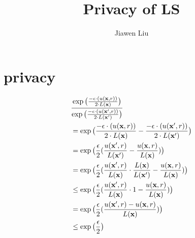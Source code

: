 \documentclass{article}
\begin{document}
\title{Privacy of LS}

\author[*]{Jiawen Liu}
\maketitle

\section{privacy}
  \begin{equation*}
  \begin{split}
  & \frac {\exp\big(
  \frac{-\epsilon\cdot(u(\textbf{x}, {r}))}{2\cdot L(\textbf{x})}
  \big)}
  {\exp\big(
  \frac
  {-\epsilon\cdot(u(\textbf{x}', {r}))}{2\cdot L(\textbf{x}')}
  \big)}\\
  & = \exp\big(
  \frac{-\epsilon\cdot(u(\textbf{x}, {r}))}{2\cdot L(\textbf{x})}
  - 
  \frac{-\epsilon\cdot(u(\textbf{x}', {r}))}{2\cdot L(\textbf{x}')}
  \big)\\
  & = \exp
  \big(
  \frac{\epsilon}{2}
  (\frac{u(\textbf{x}', {r})}{L(\textbf{x}')}
  - 
  \frac{u(\textbf{x}, {r})}{ L(\textbf{x})})
  \big)\\
  & = \exp
  \big(
  \frac{\epsilon}{2}
  (\frac{u(\textbf{x}', {r})}{ L(\textbf{x})}\cdot \frac{L(\textbf{x})}{L(\textbf{x}')}
  - 
  \frac{u(\textbf{x}, {r})}{L(\textbf{x})} )
  \big)\\
  & \leq \exp
  \big(
  \frac{\epsilon}{2}
  (\frac{u(\textbf{x}', {r})}{ L(\textbf{x})}\cdot 1
  - 
  \frac{u(\textbf{x}, {r})}{L(\textbf{x})})
  \big)\\
  & = \exp
  \big(
  \frac{\epsilon}{2}
  (\frac{u(\textbf{x}', {r}) - u(\textbf{x}, {r})}{L(\textbf{x})})
  \big)\\
  & \leq \exp
  \big(
  \frac{\epsilon}{2}
  \big)
  \end{split}
  \end{equation*}


  
\end{document}
